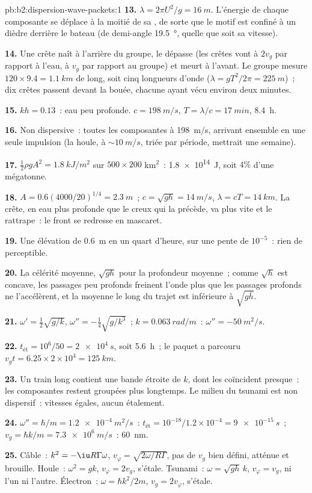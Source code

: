 \begin{solution}{pb:b2:dispersion-wave-packets:1}
\textbf{13.} $\lambda = 2\pi U^2/g = \qty{16}{m}$. L'énergie de chaque composante
se déplace à la moitié de sa , de sorte que le motif est confiné à un dièdre
derrière le bateau (de demi-angle \qty{19.5}{\degree}, quelle que soit sa vitesse).

\textbf{14.} Une crête naît à l'arrière du groupe, le dépasse
(les crêtes vont à $2v_g$ par rapport à l'eau, à $v_g$ par rapport au
groupe) et meurt à l'avant. Le groupe mesure $120 \times 9.4 = \qty{1.1}{km}$
de long, soit cinq longueurs d'onde ($\lambda = gT^2/2\pi = \qty{225}{m}$)~; dix crêtes passent devant la
bouée, chacune ayant vécu environ deux minutes.

\textbf{15.} $kh = 0.13$~: eau peu profonde. $c = \qty{198}{m/s}$, $T = \lambda/c = \qty{17}{min}$,
\qty{8.4}{h}.

\textbf{16.} Non dispersive~: toutes les composantes à \qty{198}{m/s}, arrivant
ensemble en une seule impulsion (la houle, à $\sim\qty{10}{m/s}$, triée par période,
mettrait une semaine).

\textbf{17.} $\tfrac12\rho gA^2 = \qty{1.8}{kJ/m^2}$ sur $500 \times 200$ km$^2$~: \qty{1.8e14}{J},
soit $4\%$ d'une mégatonne.

\textbf{18.} $A = 0.6(4000/20)^{1/4} = \qty{2.3}{m}$~; $c = \sqrt{gh} = \qty{14}{m/s}$, $\lambda =
cT = \qty{14}{km}$. La crête, en eau plus profonde que le creux qui la précède,
va plus vite et le rattrape~: le front se redresse en mascaret.

\textbf{19.} Une élévation de \qty{0.6}{m} en un quart d'heure, sur une pente
de $10^{-5}$~: rien de perceptible.

\textbf{20.} La célérité moyenne, $\sqrt{gh}$ pour la profondeur moyenne~; comme
$\sqrt h$ est concave, les passages peu profonds freinent l'onde plus que les passages profonds
ne l'accélèrent, et la moyenne le long du trajet est inférieure à $\sqrt{g\bar h}$.

\textbf{21.} $\omega' = \tfrac12\sqrt{g/k}$, $\omega'' = -\tfrac14\sqrt{g/k^3}$~; $k = \qty{0.063}{rad/m}$~:
$\omega'' = \qty{-50}{m^2/s}$.

\textbf{22.} $t_{\text{ét}} = 10^6/50 = \qty{2e4}{s}$, soit \qty{5.6}{h}~; le paquet a
parcouru $v_gt = 6.25 \times 2 \times 10^4 = \qty{125}{km}$.

\textbf{23.} Un train long contient une bande étroite de $k$, dont les  coïncident presque~: les composantes restent groupées plus longtemps. Le
milieu du tsunami est non dispersif~: vitesses égales, aucun étalement.

\textbf{24.} $\omega'' = \hbar/m = \qty{1.2e-4}{m^2/s}$~: $t_{\text{ét}} = 10^{-18}/1.2 \times
10^{-4} = \qty{9e-15}{s}$~; $v_g = \hbar k/m = \qty{7.3e6}{m/s}$~: \qty{60}{nm}.

\textbf{25.} Câble~: $k^2 = -\iu R\Gamma\omega$, $v_\varphi = \sqrt{2\omega/R\Gamma}$, pas de
$v_g$ bien défini, atténue et brouille. Houle~: $\omega^2 = gk$, $v_\varphi = 2v_g$,
s'étale. Tsunami~: $\omega = \sqrt{gh}\,k$, $v_\varphi = v_g$, ni l'un ni l'autre. Électron~:
$\omega = \hbar k^2/2m$, $v_g = 2v_\varphi$, s'étale.
\end{solution}
